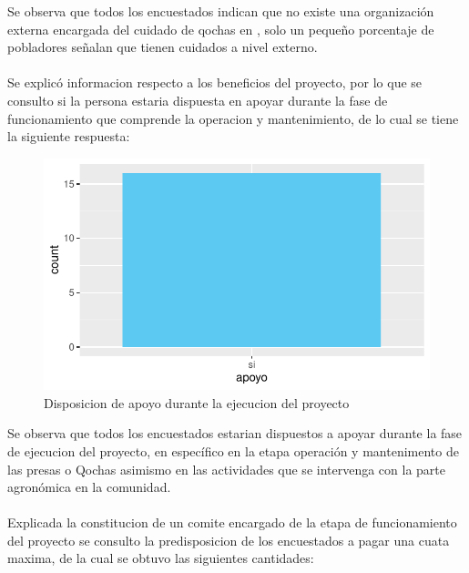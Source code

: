\documentclass[12pt]{article}\usepackage[]{graphicx}\usepackage[]{xcolor}
\makeatletter
\def\maxwidth{ %
  \ifdim\Gin@nat@width>\linewidth
    \linewidth
  \else
    \Gin@nat@width
  \fi
}
\newenvironment{knitrout}{}{} %
\makeatother
\begin{document}
	Se observa que todos los encuestados indican que no existe una organización externa encargada del cuidado de qochas en \comunidad, solo un pequeño porcentaje de pobladores señalan que tienen cuidados a nivel externo.\\
	\\
	Se explicó informacion respecto a los beneficios del proyecto, por lo que se consulto si la persona estaria dispuesta en apoyar durante la fase de funcionamiento que comprende la operacion y mantenimiento, de lo cual se tiene la siguiente respuesta:
	\begin{figure}[H]
	\centering
\begin{knitrout}
\color{fgcolor}
\includegraphics[width=\maxwidth]{figure/veintisiete-1} 
\end{knitrout}
	\caption{Disposicion de apoyo durante la ejecucion del proyecto}
	\end{figure}
	Se observa que todos los encuestados estarian dispuestos a apoyar durante la fase de ejecucion del proyecto, en específico en la etapa operación y mantenimento de las presas o Qochas asimismo en las actividades que se intervenga con la parte agronómica en la comunidad.\\
	\\
	Explicada la constitucion de un comite encargado de la etapa de funcionamiento del proyecto se consulto la predisposicion de los encuestados a pagar una cuata maxima, de la cual se obtuvo las siguientes cantidades:
\end{document}
